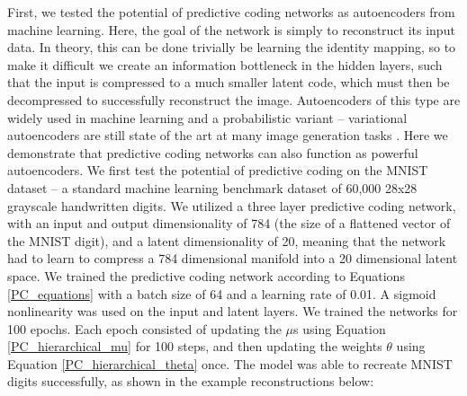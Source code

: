 First, we tested the potential of predictive coding networks as autoencoders \citep{hinton1994autoencoders} from machine learning. Here, the goal of the network is simply to reconstruct its input data. In theory, this can be done trivially be learning the identity mapping, so to make it difficult we create an information bottleneck \citep{tishby2000information} in the hidden layers, such that the input is compressed to a much smaller latent code, which must then be decompressed to successfully reconstruct the image. Autoencoders of this type are widely used in machine learning and a probabilistic variant -- variational autoencoders \citep{kingma_auto-encoding_2013} are still state of the art at many image generation tasks \citep{child2020very}. Here we demonstrate that predictive coding networks can also function as powerful autoencoders. We first test the potential of predictive coding on the MNIST dataset -- a standard machine learning benchmark dataset of 60,000 28x28 grayscale handwritten digits. We utilized a three layer predictive coding network, with an input and output dimensionality of 784 (the size of a flattened vector of the MNIST digit), and a latent dimensionality of 20, meaning that the network had to learn to compress a 784 dimensional manifold into a 20 dimensional latent space. We trained the predictive coding network according to Equations \ref{PC_equations} with a batch size of 64 and a learning rate of 0.01. A sigmoid nonlinearity was used on the input and latent layers. We trained the networks for 100 epochs. Each epoch consisted of updating the $\mu$s using Equation \ref{PC_hierarchical_mu} for 100 steps, and then updating the weights $\theta$ using Equation \ref{PC_hierarchical_theta} once. The model was able to recreate MNIST digits successfully, as shown in the example reconstructions below:

